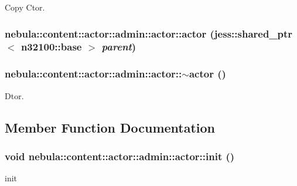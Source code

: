 Copy Ctor. \hypertarget{classnebula_1_1content_1_1actor_1_1admin_1_1actor_a17df7b068ec0a1ea2fd32a0ffd163ceb}{
\subsubsection[{actor}]{\setlength{\rightskip}{0pt plus 5cm}nebula::content::actor::admin::actor::actor (jess::shared\_\-ptr$<$ {\bf n32100::base} $>$ {\em parent})}}
\label{classnebula_1_1content_1_1actor_1_1admin_1_1actor_a17df7b068ec0a1ea2fd32a0ffd163ceb}
\hypertarget{classnebula_1_1content_1_1actor_1_1admin_1_1actor_ab744500c0b6b457652b61534426be637}{
\subsubsection[{$\sim$actor}]{\setlength{\rightskip}{0pt plus 5cm}nebula::content::actor::admin::actor::$\sim$actor ()}}
\label{classnebula_1_1content_1_1actor_1_1admin_1_1actor_ab744500c0b6b457652b61534426be637}


Dtor. 

\subsection{Member Function Documentation}
\hypertarget{classnebula_1_1content_1_1actor_1_1admin_1_1actor_a36b8f2c3d8b0bab0a2a3540ec1bf693d}{
\subsubsection[{init}]{\setlength{\rightskip}{0pt plus 5cm}void nebula::content::actor::admin::actor::init ()}}
\label{classnebula_1_1content_1_1actor_1_1admin_1_1actor_a36b8f2c3d8b0bab0a2a3540ec1bf693d}


init 

